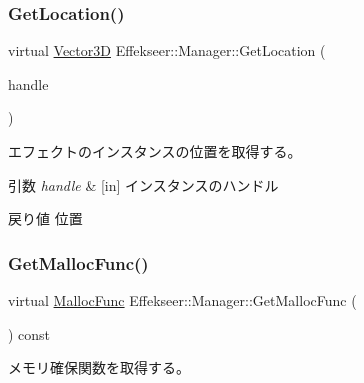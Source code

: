 \subsubsection{\texorpdfstring{Get\+Location()}{GetLocation()}}
{\footnotesize\ttfamily virtual \mbox{\hyperlink{struct_effekseer_1_1_vector3_d}{Vector3D}} Effekseer\+::\+Manager\+::\+Get\+Location (\begin{DoxyParamCaption}\item[{\mbox{\hyperlink{namespace_effekseer_afba58b8d812da862190e9bbfc040824a}{Handle}}}]{handle }\end{DoxyParamCaption})\hspace{0.3cm}{\ttfamily [pure virtual]}}



エフェクトのインスタンスの位置を取得する。 


\begin{DoxyParams}{引数}
{\em handle} & \mbox{[}in\mbox{]} インスタンスのハンドル \\
\hline
\end{DoxyParams}
\begin{DoxyReturn}{戻り値}
位置 
\end{DoxyReturn}
\mbox{\label{class_effekseer_1_1_manager_aacbf3bb08982ff3b7fd3c5685b88c286}} 
\subsubsection{\texorpdfstring{Get\+Malloc\+Func()}{GetMallocFunc()}}
{\footnotesize\ttfamily virtual \mbox{\hyperlink{namespace_effekseer_a2f9a04a7b2d08a8f2173ce47e57ff742}{Malloc\+Func}} Effekseer\+::\+Manager\+::\+Get\+Malloc\+Func (\begin{DoxyParamCaption}{ }\end{DoxyParamCaption}) const\hspace{0.3cm}{\ttfamily [pure virtual]}}



メモリ確保関数を取得する。 

\mbox{\label{class_effekseer_1_1_manager_abd550c1abf3f8b324ba9a5f71a735ff8}} 
